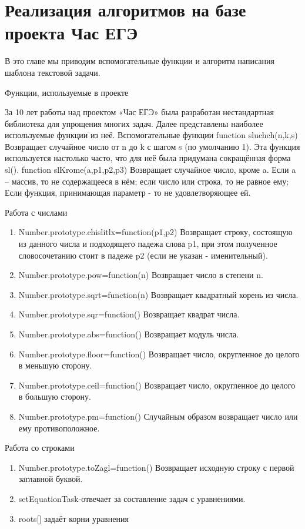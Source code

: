 
\section{Реализация алгоритмов на базе проекта Час ЕГЭ}
В это главе мы приводим вспомогательные функции и алгоритм написания шаблона текстовой задачи.

Функции, используемые в проекте

За 10 лет работы над проектом «Час ЕГЭ» была разработан нестандартная библиотека для упрощения многих задач. Далее представлены наиболее используемые функции из неё.
Вспомогательные функции
function sluchch(n,k,s) Возвращает случайное число от n до k с шагом s (по умолчанию 1). Эта функция используется настолько часто, что для неё была придумана сокращённая форма sl(). function slKrome(a,p1,p2,p3) Возвращает случайное число, кроме a. Если a – массив, то не содержащееся в нём; если число или строка, то не равное ему; Если функция, принимающая параметр - то не удовлетворяющее ей.
\par Работа с числами
\begin{enumerate}
    \item Number.prototype.chislitlx=function(p1,p2) Возвращает строку, состоящую из данного числа и подходящего падежа слова p1, при этом полученное словосочетанию стоит в падеже p2 (если не указан - именительный).
    \item Number.prototype.pow=function(n) Возвращает число в степени n. 
    \item Number.prototype.sqrt=function(n) Возвращает квадратный корень из числа. 
    \item Number.prototype.sqr=function() Возвращает квадрат числа. 
    \item Number.prototype.abs=function() Возвращает модуль числа. 
    \item Number.prototype.floor=function() Возвращает число, округленное до целого в меньшую сторону. 
    \item Number.prototype.ceil=function() Возвращает число, округленное до целого в большую сторону. 
    \item Number.prototype.pm=function() Случайным образом возвращает число или ему противоположное. 
\end{enumerate}
\par Работа со строками 
\begin{enumerate}
    \item Number.prototype.toZagl=function() Возвращает исходную строку с первой заглавной буквой.
    \item setEquationTask-отвечает за составление задач с уравнениями.
    \item roots[] задаёт корни уравнения
\end{enumerate}

